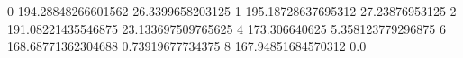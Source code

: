 0 194.28848266601562 26.3399658203125
1 195.18728637695312 27.23876953125
2 191.08221435546875 23.133697509765625
4 173.306640625 5.358123779296875
6 168.68771362304688 0.73919677734375
8 167.94851684570312 0.0
